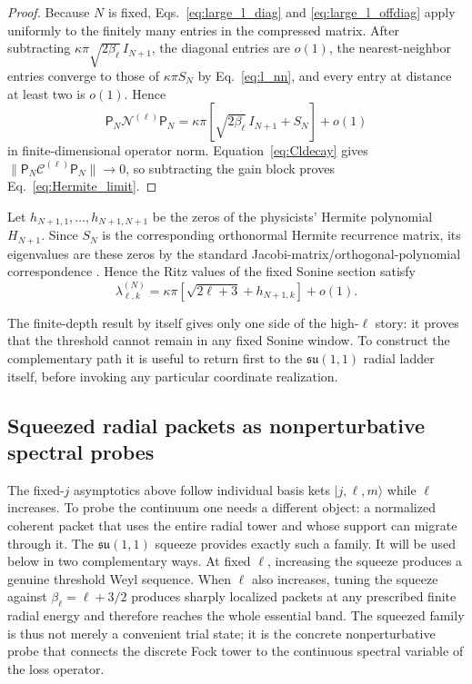 \documentclass[11pt]{article}
\numberwithin{equation}{section}
\theoremstyle{definition}
\begin{document}
\begin{proof}
Because $N$ is fixed, Eqs.~\eqref{eq:large_l_diag} and
\eqref{eq:large_l_offdiag} apply uniformly to the finitely many entries in the
compressed matrix.  After subtracting
$\kappa\pi\sqrt{2\beta_\ell}\,I_{N+1}$, the diagonal entries are $o(1)$, the
nearest-neighbor entries converge to those of $\kappa\pi S_N$ by
Eq.~\eqref{eq:l_nn}, and every entry at distance at least two is $o(1)$.
Hence
\begin{equation}
 \mathsf P_N\mathcal N^{(\ell)}\mathsf P_N
 =\kappa\pi[\sqrt{2\beta_\ell}\,I_{N+1}+S_N]+o(1)
\end{equation}
in finite-dimensional operator norm.  Equation~\eqref{eq:Cldecay} gives
$\|\mathsf P_N\mathcal C^{(\ell)}\mathsf P_N\|\to0$, so subtracting the gain
block proves Eq.~\eqref{eq:Hermite_limit}.
\end{proof}

Let
$h_{N+1,1},\ldots,h_{N+1,N+1}$
be the zeros of the physicists' Hermite polynomial $H_{N+1}$.  Since $S_N$ is the corresponding orthonormal Hermite recurrence matrix, its eigenvalues are these zeros by the standard Jacobi-matrix/orthogonal-polynomial correspondence \cite{Chihara1978}.  Hence the Ritz values of the
fixed Sonine section satisfy
\begin{equation}
 \lambda^{(N)}_{\ell,k}
 =
 \kappa\pi
 \left[
 \sqrt{2\ell+3}+h_{N+1,k}
 \right]
 +o(1).
 \label{eq:Ritz_large_l}
\end{equation}

The finite-depth result by itself gives only one side of the high-$\ell$
story: it proves that the threshold cannot remain in any fixed Sonine window.
To construct the complementary path it is useful to return first to the
$\mathfrak{su}(1,1)$ radial ladder itself, before invoking any particular coordinate
realization.

\subsection{Squeezed radial packets as nonperturbative spectral probes}
\label{sec:squeezed_radial_path}

The fixed-$j$ asymptotics above follow individual basis kets
$|j,\ell,m\rangle$ while $\ell$ increases.  To probe the continuum one needs a
different object: a normalized coherent packet that uses the entire radial
tower and whose support can migrate through it.  The $\mathfrak{su}(1,1)$ squeeze provides
exactly such a family.  It will be used below in two complementary ways.  At
fixed $\ell$, increasing the squeeze produces a genuine threshold Weyl
sequence.  When $\ell$ also increases, tuning the squeeze against
$\beta_\ell=\ell+3/2$ produces sharply localized packets at any prescribed
finite radial energy and therefore reaches the whole essential band.  The
squeezed family is thus not merely a convenient trial state; it is the
concrete nonperturbative probe that connects the discrete Fock tower to the
continuous spectral variable of the loss operator.
\end{document}
